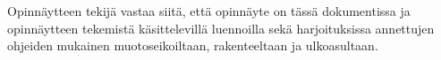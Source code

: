 \documentclass[english,12pt,a4paper,pdftex,sci,utf8]{aaltothesis}
\begin{document}
Opinn\"aytteen tekij\"a vastaa siit\"a, ett\"a opinn\"ayte on t\"ass\"a dokumentissa
ja opinn\"aytteen tekemist\"a k\"asittelevill\"a luennoilla sek\"a
harjoituksissa annettujen ohjeiden mukainen muotoseikoiltaan,
rakenteeltaan ja ulkoasultaan.\cite{grochowski2004best}


\cleardoublepage
{}



\end{document}
